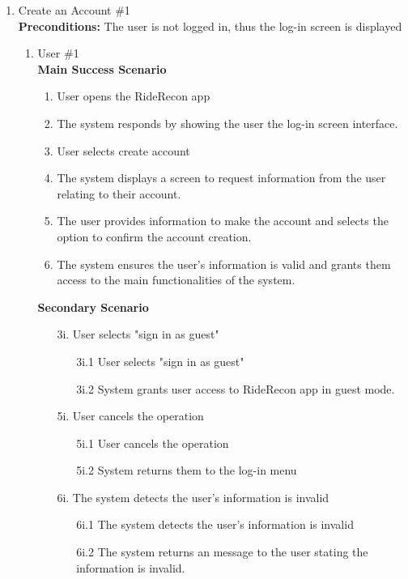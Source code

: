 \documentclass[]{article}
\begin{document}
\begin{enumerate}[label={\bf BE\arabic*.}]
	\item Create an Account \#1\\
	\textbf{Preconditions:} The user is not logged in, thus the log-in screen is displayed
	\begin{enumerate}[label={\bf VP\arabic*.}]		
		\item User \#1\\
		\textbf{Main Success Scenario}
		\begin{enumerate}[label={\arabic*.}]			
			\color{red}
			\item User opens the RideRecon app
			\item The system responds by showing the user the log-in screen interface.
			\item User selects create account
			\item The system displays a screen to request information from the user relating to their account.
			\item The user provides information to make the account and selects the option to confirm the account creation.
			\item The system ensures the user's information is valid and grants them access to the main functionalities of the system.
		\end{enumerate}
		\textbf{Secondary Scenario}
		\begin{enumerate}
			\color{red}
			\item[3i.] User selects "sign in as guest"
			\begin{enumerate}
				\item[3i.1] User selects "sign in as guest"
				\item[3i.2] System grants user access to RideRecon app in guest mode.
			\end{enumerate}
			\item[5i.] User cancels the operation
			\begin{enumerate}
				\item[5i.1] User cancels the operation
				\item[5i.2] System returns them to the log-in menu
			\end{enumerate}													\item[6i.] The system detects the user's information is invalid
			\begin{enumerate}
				\item[6i.1] The system detects the user's information is invalid
				\item[6i.2] The system returns an message to the user stating the information is invalid.

\end{enumerate}
\end{enumerate}
\end{enumerate}
\end{enumerate}
\end{document}
